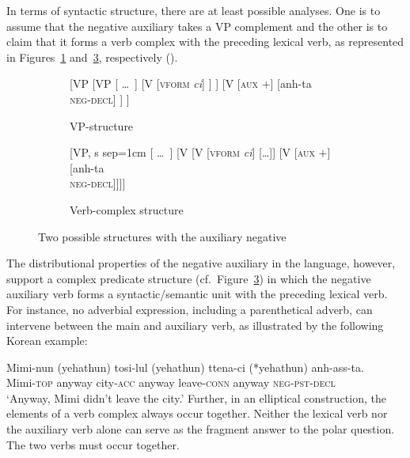 \documentclass[output=paper
                ,modfonts
		,nonflat
	        ,collection
	        ,collectionchapter
	        ,collectiontoclongg
 	        ,biblatex  
                ,babelshorthands
                ,newtxmath
                ,draftmode
                ,colorlinks, citecolor=brown 
]{./langsci/langscibook}
\begin{document}
{\begin{exe}
\begin{xlist}
\begin{exe}
\begin{xlist}
In terms of syntactic structure, there
are at least possible analyses.  One is to assume that the negative auxiliary takes a VP complement and the other is to claim that it forms a verb complex with the preceding lexical verb, as represented in Figures~\ref{fig:3a} and~\ref{fig:3b}, respectively
(\citep{Chung98a-u, Kim:16}).
%
\begin{figure}
	\begin{subfigure}[b]{0.48\textwidth}
\centering
		\begin{forest}
			[VP
				[VP
					[ \dots\ ]
					[V {[\textsc{vform} \emph{ci}]}
					]
					]
				[V {[\textsc{aux $+$}]}
					[anh-ta\\ \textsc{neg-decl}]
				]
			]	
		\end{forest}
	\caption{VP-structure}\label{fig:3a}
		\end{subfigure}	
\hfill
	\begin{subfigure}[b]{0.48\textwidth}
\centering
		\begin{forest}
			[VP, s sep=1cm
				[ \dots\ ]
				[V
					[V {[\textsc{vform} \emph{ci}]}
						[\dots]]
					[V {[\textsc{aux $+$}]}
						[anh-ta\\ \textsc{neg-decl}]]]]
		\end{forest}
	\caption{Verb-complex structure}\label{fig:3b}	
		\end{subfigure}
	\caption{Two possible structures with the auxiliary negative}
\end{figure}

The distributional properties of the negative auxiliary in the language, however, support
 a complex predicate structure (cf.\ Figure~\ref{fig:3b}) in which the negative auxiliary verb
forms a syntactic/semantic unit with the preceding lexical verb.
For instance, no adverbial expression, including
a parenthetical adverb, can intervene between
the main and auxiliary verb, as illustrated by the
following Korean example:

\ea
\gll Mimi-nun (yehathun) tosi-lul (yehathun) ttena-ci (*yehathun) anh-ass-ta. \\
     Mimi-\textsc{top} anyway city-\textsc{acc} anyway leave-\textsc{conn} anyway \textsc{neg}-\textsc{pst}-\textsc{decl} \\
\glt `Anyway, Mimi didn't leave the city.'
\z
%
Further, in an elliptical construction, the elements of a verb complex
 always occur together. Neither the lexical  verb nor the auxiliary verb alone can serve
as the fragment answer to the polar question. The two verbs
must occur together.


\end{xlist}
\end{exe}
\end{xlist}
\end{exe}}
\end{document}
